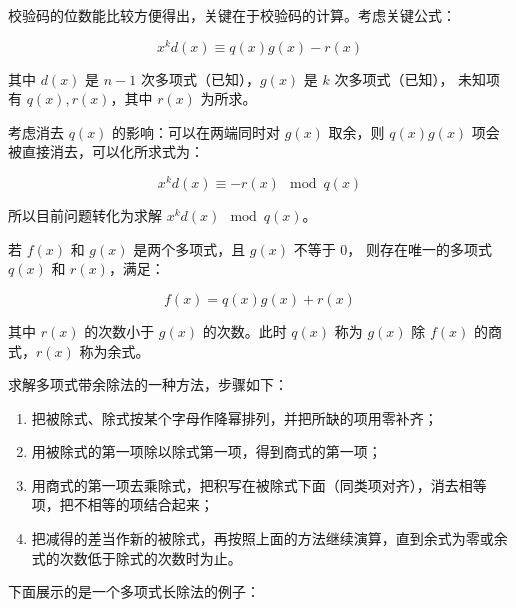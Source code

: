 校验码的位数能比较方便得出，关键在于校验码的计算。考虑关键公式：

\begin{equation*}
    x^kd(x)\equiv q(x)g(x)-r(x)
\end{equation*}

其中 $d(x)$ 是 $n-1$ 次多项式（已知），$g(x)$ 是 $k$ 次多项式（已知），
未知项有 $q(x),r(x)$，其中 $r(x)$ 为所求。

考虑消去 $q(x)$ 的影响：可以在两端同时对 $g(x)$ 取余，则 $q(x)g(x)$ 项会被直接消去，可以化所求式为：

\begin{equation*}
    x^kd(x)\equiv -r(x) \mod q(x)
\end{equation*}

所以目前问题转化为求解 $x^kd(x) \mod q(x)$。

\begin{definition}[多项式带余除法] \label{def:polynomial_division} 
若 $f(x)$ 和 $g(x)$ 是两个多项式，且 $g(x)$ 不等于 $0$，
则存在唯一的多项式 $q(x)$ 和 $r(x)$，满足：

\begin{equation*}
    f(x)=q(x)g(x)+r(x)
\end{equation*}

其中 $r(x)$ 的次数小于 $g(x)$ 的次数。此时 $q(x)$ 称为 $g(x)$ 除 $f(x)$ 的商式，$r(x)$ 称为余式。
\end{definition}

\begin{definition}[多项式长除法] \label{def:polynomial_division_method} 
求解多项式带余除法的一种方法，步骤如下：

\begin{enumerate}
    \item 把被除式、除式按某个字母作降幂排列，并把所缺的项用零补齐；
    \item 用被除式的第一项除以除式第一项，得到商式的第一项；
    \item 用商式的第一项去乘除式，把积写在被除式下面（同类项对齐），消去相等项，把不相等的项结合起来；
    \item 把减得的差当作新的被除式，再按照上面的方法继续演算，直到余式为零或余式的次数低于除式的次数时为止。
\end{enumerate}

\end{definition}

下面展示的是一个多项式长除法的例子：


